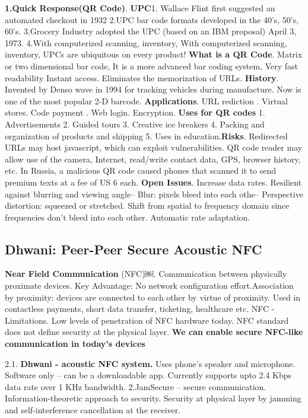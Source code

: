 \documentclass[9pt]{extarticle}
\begin{document}
\begin{multicols}{2}
\textbf{1.Quick Response(QR Code)}. \textbf{UPC}1. Wallace Flint first suggested an automated checkout in 1932 2.UPC bar code formats developed in the 40’s, 50’s, 60’s. 3.Grocery Industry adopted the UPC (based on an IBM proposal) April 3, 1973. 4.With computerized scanning, inventory, With computerized scanning, inventory, UPCs are ubiquitous on every product! \textbf{What is a QR Code}. Matrix or two dimensional bar code, It is a more advanced bar coding system, Very fast readability Instant access. Eliminates the memorization of URLs. \textbf{History}. Invented by Denso wave in 1994 for tracking vehicles during manufacture. Now is one of the most popular 2-D barcode. \textbf{Applications}. URL rediction . Virtual stores. Code payment . Web login. Encryption. \textbf{Uses for QR codes} 1. Advertisements 2. Guided tours 3. Creative ice breakers 4. Packing and organization of products and shipping 5. Uses in education.\textbf{Risks}. Redirected URLs may host javascript, which can exploit vulnerabilities. QR code reader may allow use of the camera, Internet, read/write contact data, GPS, browser history, etc. In Russia, a malicious QR code caused phones that scanned it to send premium texts at a fee of US 6 each.\textbf{ Open Issues}. Increase data rates. Resilient against blurring and viewing angle– Blur: pixels bleed into each othe– Perspective distortion: squeezed or stretched. Shift from spatial to frequency domain since frequencies don't bleed into each other. Automatic rate adaptation.

\subsection{Dhwani: Peer-Peer Secure Acoustic NFC}

\textbf{Near Field Communication} (NFC)￼. Communication between physically proximate devices. Key Advantage: No network configuration effort.Association by proximity: devices are connected to each other by virtue of proximity. Used in contactless payments, short data transfer, ticketing, healthcare etc. NFC - Limitations. Low levels of penetration of NFC hardware today. NFC standard does not define security at the physical layer. \textbf{We can enable secure NFC-like communication in today's devices} 

2.1. \textbf{Dhwani - acoustic NFC system.} Uses phone’s speaker and microphone. Software only – can be a downloadable app. Currently supports upto 2.4 Kbps data rate over 1 KHz bandwidth. 2.JamSecure – secure communication. Information-theoretic approach to security. Security at physical layer by jamming and self-interference cancellation at the receiver. 


\end{multicols}
\end{document}

